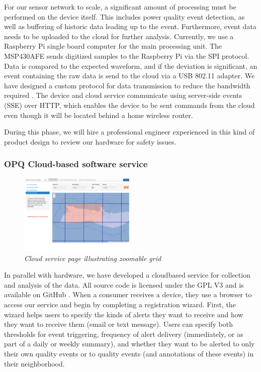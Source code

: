 For our sensor network to scale, a significant amount of processing must be performed on the device itself. This includes power quality event detection, as well as buffering of historic data leading up to the event. Furthermore, event data needs to be uploaded to the cloud for further analysis. Currently, we use a Raspberry Pi single board computer for the main processing unit. The MSP430AFE sends digitized samples to the Raspberry Pi via the SPI protocol. Data is compared to the expected waveform, and if the deviation is significant, an event containing the raw data is send to the cloud via a USB 802.11 adapter. We have designed a custom protocol for data transmission to reduce the bandwidth required \cite{opq-protocol}. The device and cloud service communicate using server-side events (SSE) over HTTP, which enables the device to be sent commands from the cloud even though it will be located behind a home wireless router.

During this phase, we will hire a professional engineer experienced in this kind of product design to review our hardware for safety issues. 

\subsubsection{OPQ Cloud-based software service}

\begin{figure}
  \includegraphics[width=0.5\textwidth]{figures/cloud-grid.eps}
  \caption{\em \small Cloud service page illustrating zoomable grid}
  \label{fig:cloud-grid}
\end{figure}  

In parallel with hardware, we have developed a cloudbased service for collection and analysis of the data. All source code is licensed under the GPL V3 and is available on GitHub \cite{opq-github}.  When a consumer receives a device, they use a browser to access our service and begin by completing a registration wizard. First, the wizard helps users to specify the kinds of alerts they want to receive and how they want to receive them (email or text message).  Users can specify both thresholds for event triggering, frequency of alert delivery (immediately, or as part of a daily or weekly summary), and whether they want to be alerted to only their own quality events or to quality events (and annotations of these events) in their neighborhood.  

